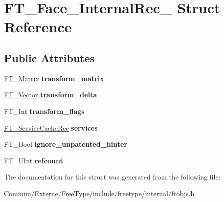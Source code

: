 \hypertarget{struct_f_t___face___internal_rec__}{}\section{F\+T\+\_\+\+Face\+\_\+\+Internal\+Rec\+\_\+ Struct Reference}
\label{struct_f_t___face___internal_rec__}
\subsection*{Public Attributes}
\begin{DoxyCompactItemize}
\item 
\hyperlink{struct_f_t___matrix__}{F\+T\+\_\+\+Matrix} {\bfseries transform\+\_\+matrix}\hypertarget{struct_f_t___face___internal_rec___ab4be2dcda098e6136f5701580d18032d}{}\label{struct_f_t___face___internal_rec___ab4be2dcda098e6136f5701580d18032d}

\item 
\hyperlink{struct_f_t___vector__}{F\+T\+\_\+\+Vector} {\bfseries transform\+\_\+delta}\hypertarget{struct_f_t___face___internal_rec___ab6c2aacdac58312273395b21b8d168c6}{}\label{struct_f_t___face___internal_rec___ab6c2aacdac58312273395b21b8d168c6}

\item 
F\+T\+\_\+\+Int {\bfseries transform\+\_\+flags}\hypertarget{struct_f_t___face___internal_rec___a2495aced35040e1b7c2bc0afcd7a920d}{}\label{struct_f_t___face___internal_rec___a2495aced35040e1b7c2bc0afcd7a920d}

\item 
\hyperlink{struct_f_t___service_cache_rec__}{F\+T\+\_\+\+Service\+Cache\+Rec} {\bfseries services}\hypertarget{struct_f_t___face___internal_rec___abc3acb3bf5db056bb9c549af04f07963}{}\label{struct_f_t___face___internal_rec___abc3acb3bf5db056bb9c549af04f07963}

\item 
F\+T\+\_\+\+Bool {\bfseries ignore\+\_\+unpatented\+\_\+hinter}\hypertarget{struct_f_t___face___internal_rec___af898fd754c36c3f34c9ce0e88eb101c9}{}\label{struct_f_t___face___internal_rec___af898fd754c36c3f34c9ce0e88eb101c9}

\item 
F\+T\+\_\+\+U\+Int {\bfseries refcount}\hypertarget{struct_f_t___face___internal_rec___a05d49c857c024a50441e17899803f56c}{}\label{struct_f_t___face___internal_rec___a05d49c857c024a50441e17899803f56c}

\end{DoxyCompactItemize}


The documentation for this struct was generated from the following file\+:\begin{DoxyCompactItemize}
\item 
Commun/\+Externe/\+Free\+Type/include/freetype/internal/ftobjs.\+h\end{DoxyCompactItemize}
